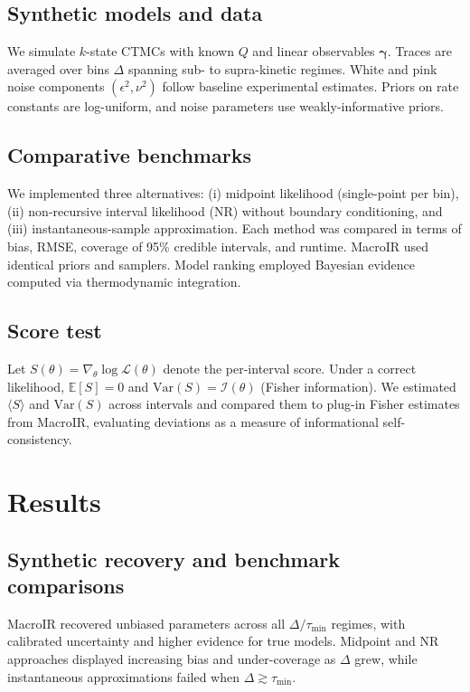 \documentclass[9pt]{elife}
\begin{document}
	\subsection*{Synthetic models and data}
	We simulate $k$-state CTMCs with known $Q$ and linear observables $\bm{\gamma}$. 
	Traces are averaged over bins $\Delta$ spanning sub- to supra-kinetic regimes. 
	White and pink noise components $(\epsilon^2,\nu^2)$ follow baseline experimental estimates. 
	Priors on rate constants are log-uniform, and noise parameters use weakly-informative priors.
	
	\subsection*{Comparative benchmarks}
	We implemented three alternatives: (i) midpoint likelihood (single-point per bin), (ii) non-recursive interval likelihood (NR) without boundary conditioning, and (iii) instantaneous-sample approximation. 
	Each method was compared in terms of bias, RMSE, coverage of 95\% credible intervals, and runtime. 
	MacroIR used identical priors and samplers. 
	Model ranking employed Bayesian evidence computed via thermodynamic integration.
	
	\subsection*{Score test}
	Let $S(\theta)=\nabla_\theta \log \mathcal{L}(\theta)$ denote the per-interval score. 
	Under a correct likelihood, $\mathbb{E}[S]=0$ and $\mathrm{Var}(S)=\mathcal{I}(\theta)$ (Fisher information). 
	We estimated $\langle S\rangle$ and $\mathrm{Var}(S)$ across intervals and compared them to plug-in Fisher estimates from MacroIR, evaluating deviations as a measure of informational self-consistency.
	
	\section*{Results}
	
	\subsection*{Synthetic recovery and benchmark comparisons}
	MacroIR recovered unbiased parameters across all $\Delta/\tau_{\min}$ regimes, with calibrated uncertainty and higher evidence for true models. 
	Midpoint and NR approaches displayed increasing bias and under-coverage as $\Delta$ grew, while instantaneous approximations failed when $\Delta\gtrsim\tau_{\min}$.
	
\end{document}
